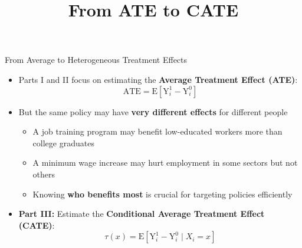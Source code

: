 \documentclass[hyperref={pdfpagelabels=false}]{beamer}
\begin{document}
\begin{frame}{From Average to Heterogeneous Treatment Effects}
	\begin{itemize}
		\item Parts I and II focus on estimating the \textbf{Average Treatment Effect (ATE)}:
		\begin{equation*}
			\text{ATE} = \mathrm{E}[\mathrm{Y}^{1}_{i} - \mathrm{Y}^{0}_{i}]
		\end{equation*}

		\vspace{0.2cm}
		\item But the same policy may have \textbf{very different effects} for different people
		\vspace{0.2cm}
		\begin{itemize}
			\item A job training program may benefit low-educated workers more than college graduates
			\vspace{0.2cm}
			\item A minimum wage increase may hurt employment in some sectors but not others
			\vspace{0.2cm}
			\item Knowing \textbf{who benefits most} is crucial for targeting policies efficiently
		\end{itemize}
		\vspace{0.3cm}
		\item \textbf{Part III:} Estimate the \textbf{Conditional Average Treatment Effect (CATE)}:
		\begin{equation*}
			\tau(x) = \mathrm{E}[\mathrm{Y}^{1}_{i} - \mathrm{Y}^{0}_{i} \mid X_{i} = x]
		\end{equation*}
	\end{itemize}
\end{frame}




\title[]
{From ATE to CATE}

\author{}
\institute{}
\date{}

\begin{frame}{}
	\titlepage
\end{frame}
\end{document}
